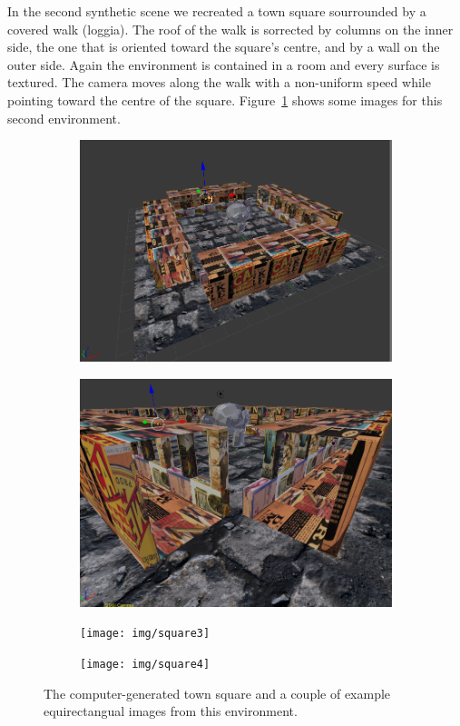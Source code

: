 In the second synthetic scene we recreated a town square sourrounded by
a covered walk (loggia). The roof of the walk is sorrected by columns on the inner
side, the one that is oriented toward the square's centre, and by a wall on the
outer side.
Again the environment is contained in a room and every surface is textured.
The camera moves along the walk with a non-uniform speed while pointing toward
the centre of the square. Figure~\ref{fig:test_square} shows some images
for this second environment.
%
\begin{figure}
\centering
	\begin{subfigure}{0.4\textwidth}
		\centering
		\includegraphics[width=\textwidth]{img/square1}
	\end{subfigure}
	\begin{subfigure}{0.4\textwidth}
		\centering
		\includegraphics[width=\textwidth]{img/square2}
	\end{subfigure}
	\begin{subfigure}{0.8\textwidth}
		\centering
		\texttt{[image: img/square3]}
	\end{subfigure}
	\begin{subfigure}{0.8\textwidth}
		\centering
		\texttt{[image: img/square4]}
	\end{subfigure}
	\caption{The computer-generated town square and a couple of example
	equirectangual images from this environment.}
    \label{fig:test_square}
\end{figure}

